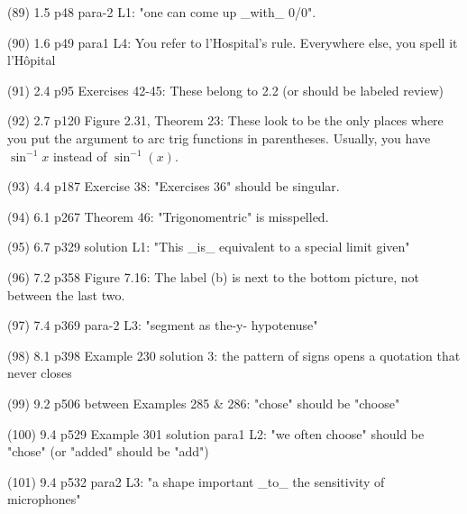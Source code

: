 {(89)  1.5 p48 para-2 L1: "one can come up _with_ 0/0".

(90)  1.6 p49 para1 L4: You refer to l'Hospital's rule.  Everywhere else, you spell it l'H\^opital

(91)  2.4 p95 Exercises 42-45: These belong to 2.2 (or should be labeled review)

(92)  2.7 p120 Figure 2.31, Theorem 23: These look to be the only places where you put the argument to arc trig functions in parentheses.  Usually, you have $\sin^{-1}x$ instead of $\sin^{-1}(x)$.

(93)  4.4 p187 Exercise 38: "Exercises 36" should be singular.

(94)  6.1 p267 Theorem 46: "Trigonomentric" is misspelled.

(95)  6.7 p329 solution L1: "This _is_ equivalent to a special limit given"

(96)  7.2 p358 Figure 7.16: The label (b) is next to the bottom picture, not between the last two.

(97)  7.4 p369 para-2 L3: "segment as the-y- hypotenuse"

(98)  8.1 p398 Example 230 solution 3: the pattern of signs opens a quotation that never closes

(99)  9.2 p506 between Examples 285 & 286: "chose" should be "choose"

(100)  9.4 p529 Example 301 solution para1 L2: "we often choose" should be "chose" (or "added" should be "add")

(101)  9.4 p532 para2 L3: "a shape important _to_ the sensitivity of microphones"

}
